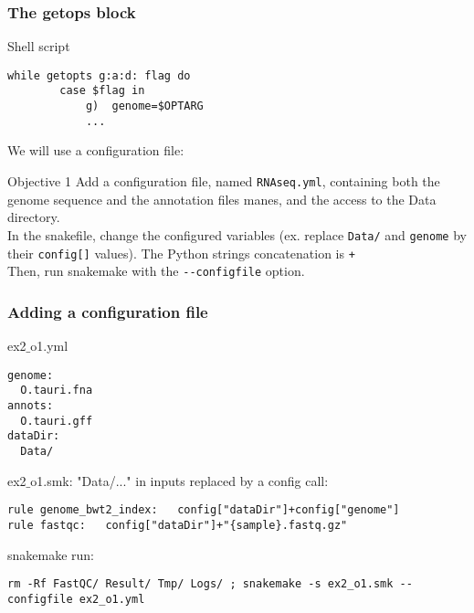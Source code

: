\begin{frame}[containsverbatim]
\frametitle{The getops block}
\begin{exampleblock}{Shell script}
\begin{lstlisting}
while getopts g:a:d: flag do
        case $flag in
            g)  genome=$OPTARG 
            ...
\end{lstlisting}
\end{exampleblock}
We will use a configuration file:
\begin{exampleblock}{Objective 1}
Add a configuration file, named \verb|RNAseq.yml|, containing both the genome sequence and the annotation files manes, and the access to the Data directory. \\
In the snakefile, change the configured variables (ex. replace \verb|Data/| and \verb|genome| by their \verb|config[]| values). The Python strings concatenation is \verb|+|\\
Then, run snakemake with the \verb|--configfile| option.
\end{exampleblock}
\end{frame}
\begin{frame}[containsverbatim]
\frametitle{Adding a configuration file}
\begin{exampleblock}{ex2$\_$o1.yml}
\begin{lstlisting}
genome:
  O.tauri.fna
annots:
  O.tauri.gff
dataDir:
  Data/
\end{lstlisting}
\end{exampleblock}
\begin{exampleblock}{ex2$\_$o1.smk: "Data/..." in inputs replaced by a config call:}
\begin{lstlisting}
rule genome_bwt2_index:   config["dataDir"]+config["genome"]
rule fastqc:   config["dataDir"]+"{sample}.fastq.gz"
\end{lstlisting}
\end{exampleblock}
\begin{exampleblock}{snakemake run:}
\begin{lstlisting}
rm -Rf FastQC/ Result/ Tmp/ Logs/ ; snakemake -s ex2_o1.smk --configfile ex2_o1.yml
\end{lstlisting}
\end{exampleblock}
\end{frame}
